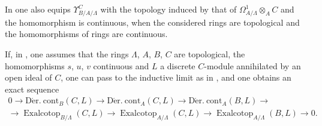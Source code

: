 \begin{env}[20.7.12]
\label{0.20.7.12}
In  one also equips $\Upsilon^C_{B/A/\Lambda}$ with the topology induced by that of $\Omega^1_{A/\Lambda}\otimes_A C$ and the homomorphism  is continuous, when the considered rings are topological and the homomorphisms of rings are continuous.
\end{env}

\begin{env}[20.7.13]
\label{0.20.7.13}
If, in , one assumes that the rings $\Lambda$, $A$, $B$, $C$ are topological, the homomorphisms $s$, $u$, $v$ continuous and $L$ a discrete $C$-module annihilated by an open ideal of $C$, one can pass to the inductive limit as in , and one obtains an exact sequence
\begin{equation}
\tag{20.7.13.1}
  \label{0.20.7.13.1}
\begin{split}
  0\to\operatorname{D\acute{e}r.\ cont}_B(C,L)\to\operatorname{D\acute{e}r.\ cont}_A(C,L)\to\operatorname{D\acute{e}r.\ cont}_A(B,L)\to \\
  \to\operatorname{Exalcotop}_{B/\Lambda}(C,L)\to\operatorname{Exalcotop}_{A/\Lambda}(C,L)\to\operatorname{Exalcotop}_{A/\Lambda}(B,L)\to 0.
\end{split}
\end{equation}
\end{env}


